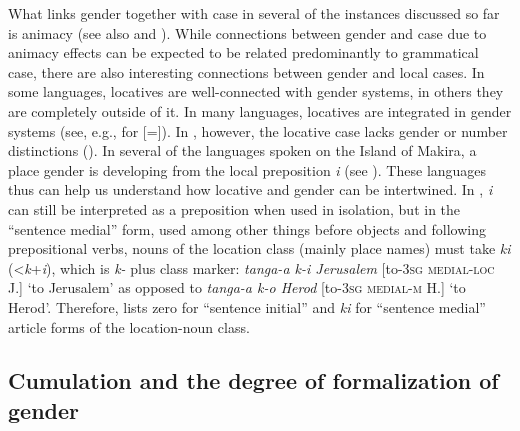\documentclass[output=collectionpaper]{langsci/langscibook}
\begin{document}
What links gender together with case in several of the instances discussed so far is animacy (see also  and ). While connections between gender and case due to animacy effects can be expected to be related predominantly to grammatical case, there are also interesting connections between gender and local cases. In some languages, locatives are well-connected with gender systems, in others they are completely outside of it. In many  languages, locatives are integrated in gender systems (see, e.g., \citealt{Bresnan1989} for  [=]). In , however, the locative case lacks gender or number distinctions (\citealt[12]{Thomason2003}). In several of the  languages spoken on the Island of Makira, a place gender is developing from the local preposition \textit{i} (see ). These languages thus can help us understand how locative and gender can be intertwined. In , \textit{i} can still be interpreted as a preposition when used in isolation, but in the ``sentence medial'' form, used among other things before objects and following prepositional verbs, nouns of the location class (mainly place names) must take \textit{ki} (<\textit{k}+\textit{i}), which is \textit{k-} plus class marker: \textit{tanga-a k-i Jerusalem} [to-\textsc{3sg} \textsc{medial-loc} J.] `to Jerusalem' as opposed to \textit{tanga-a k-o Herod} [to-\textsc{3sg medial-m} H.] `to Herod'. Therefore, \cite[26]{Mellow2013} lists zero for ``sentence initial'' and \textit{ki} for ``sentence medial'' article forms of the location-noun class.


  \subsection{Cumulation and the degree of formalization of gender}
  \label{sec:WDG:8.3}
\end{document}
